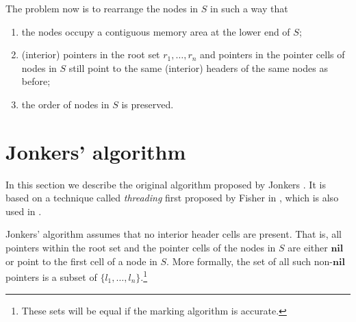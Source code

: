 \documentclass[10pt,a4paper,final,twocolumn]{article}
\begin{document}
%
The problem now is to rearrange the nodes in $S$ in such a way that
\begin{enumerate}
\item the nodes occupy a contiguous memory area at the lower end of $S$;
\item (interior) pointers in the root set $r_1,\ldots,r_n$ and pointers in the pointer cells
  of nodes in $S$ still point to the same (interior) headers of the same nodes as before;
\item the order of nodes in $S$ is preserved.
\end{enumerate}


\section{Jonkers' algorithm}
\label{sec:jonkers}


In this section we describe the original algorithm proposed by Jonkers \cite{Jonkers79}.
It is based on a technique called \emph{threading} first proposed by Fisher
in \cite{Fisher74}, which is also used in \cite{Dewar77,Hanson77,Morris78,Thorelli76}.

Jonkers' algorithm assumes that no interior header cells are present. That is, all pointers
within the root set and the pointer cells of the nodes in $S$ are either $\mathbf{nil}$ or point to
the first cell of a node in $S$. More formally, the set of all such non-$\mathbf{nil}$ pointers
is a subset of $\{l_1,\ldots,l_n\}$.\footnote{These sets will be equal if the marking algorithm
is accurate.}
\end{document}
